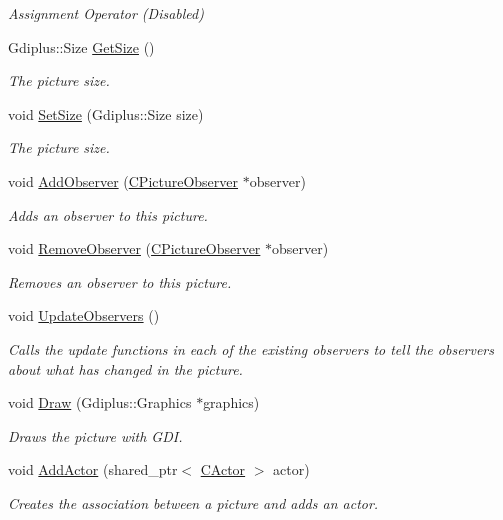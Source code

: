 \begin{DoxyCompactItemize}
\begin{DoxyCompactList}\small\item\em Assignment Operator (Disabled) \end{DoxyCompactList}\item 
Gdiplus\+::\+Size \hyperlink{class_c_picture_af2677c395a3cb8d6e7d0860839801e5b}{Get\+Size} ()
\begin{DoxyCompactList}\small\item\em The picture size. \end{DoxyCompactList}\item 
void \hyperlink{class_c_picture_a66b8de27d3435e19024307254e918e3a}{Set\+Size} (Gdiplus\+::\+Size size)
\begin{DoxyCompactList}\small\item\em The picture size. \end{DoxyCompactList}\item 
void \hyperlink{class_c_picture_a6be8632e9b1c468dcf27e8452baf5605}{Add\+Observer} (\hyperlink{class_c_picture_observer}{C\+Picture\+Observer} $\ast$observer)
\begin{DoxyCompactList}\small\item\em Adds an observer to this picture. \end{DoxyCompactList}\item 
void \hyperlink{class_c_picture_a548ad72979b2a11c2669d9896f32bf92}{Remove\+Observer} (\hyperlink{class_c_picture_observer}{C\+Picture\+Observer} $\ast$observer)
\begin{DoxyCompactList}\small\item\em Removes an observer to this picture. \end{DoxyCompactList}\item 
void \hyperlink{class_c_picture_a971ca9c9100725b7d1a900adcfe889d6}{Update\+Observers} ()
\begin{DoxyCompactList}\small\item\em Calls the update functions in each of the existing observers to tell the observers about what has changed in the picture. \end{DoxyCompactList}\item 
void \hyperlink{class_c_picture_aca6a4829388fdfe3ecdc42f0e788b712}{Draw} (Gdiplus\+::\+Graphics $\ast$graphics)
\begin{DoxyCompactList}\small\item\em Draws the picture with G\+D\+I. \end{DoxyCompactList}\item 
void \hyperlink{class_c_picture_af1afa6bacb63be5da88bd212a97c9931}{Add\+Actor} (shared\+\_\+ptr$<$ \hyperlink{class_c_actor}{C\+Actor} $>$ actor)
\begin{DoxyCompactList}\small\item\em Creates the association between a picture and adds an actor. \end{DoxyCompactList}\end{DoxyCompactItemize}


